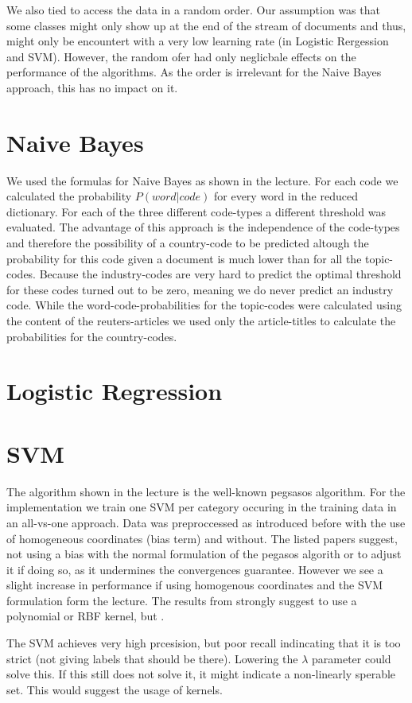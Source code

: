 \documentclass{article}
\begin{document}
We also tied to access the data in a random order. Our assumption was that some classes might only show up at the end of the stream of documents and thus, might only be encountert with a very low learning rate (in Logistic Rergession and SVM).
However, the random ofer had only neglicbale effects on the performance of the algorithms. As the order is irrelevant for the Naive Bayes approach, this has no impact on it.

\section*{Naive Bayes}
We used the formulas for Naive Bayes as shown in the lecture. For each code we calculated the probability $P(word | code)$ for every word in the reduced dictionary.
For each of the three different code-types a different threshold was evaluated. The advantage of this approach is the independence of the code-types and therefore the possibility of a country-code to be predicted altough the probability for this code given a document is much lower than for all the topic-codes. Because the industry-codes are very hard to predict the optimal threshold for these codes turned out to be zero, meaning we do never predict an industry code.
While the word-code-probabilities for the topic-codes were calculated using the content of the reuters-articles we used only the article-titles to calculate the probabilities for the country-codes. 

\section*{Logistic Regression}
\lipsum[1-4] %

\section*{SVM}
The algorithm shown in the lecture is the well-known pegsasos algorithm\cite{shalev-shwartz_pegasos:_2011,shalev-shwartz_pegasos:_????}. For the implementation we train one SVM per category occuring in the training data in an all-vs-one approach.
Data was preproccessed as introduced before with the use of homogeneous coordinates (bias term) and without. The listed papers suggest, not using a bias with the normal formulation of the pegasos algorith or to adjust it if doing so, as it undermines the convergences guarantee. However we see a slight increase in performance if using homogenous coordinates and the SVM formulation form the lecture.
The results from \cite{joachims_text_1998} strongly suggest to use a polynomial or RBF kernel, but .


The SVM achieves very high prcesision, but poor recall indincating that it is too strict (not giving labels that should be there). Lowering the $\lambda$ parameter could solve this. If this still does not solve it, it might indicate a non-linearly sperable set. This would suggest the usage of kernels.


\printbibliography
\end{document}
